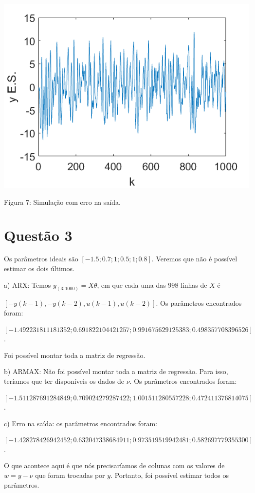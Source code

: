 \documentclass{rbfin}
\begin{document}
\begin{center}
\includegraphics[scale=0.666]{7}

Figura 7: Simulação com erro na saída.
\end{center}


\section*{Questão 3}

Os parâmetros ideais são $[-1.5; 0.7; 1; 0.5; 1; 0.8]$. Veremos que não é possível estimar os dois últimos.

a) ARX: Temos $y_{(3:1000)} = X \theta$, em que cada uma das $998$ linhas de $X$ é 

$[-y(k-1), -y(k-2), u(k - 1), u(k - 2)]$. Os parâmetros encontrados foram: 

$[-1.492231811181352;0.691822104421257;0.991675629125383;0.498357708396526]$.

Foi possível montar toda a matriz de regressão.

b) ARMAX: Não foi possível montar toda a matriz de regressão. Para isso, teríamos que ter disponíveis os dados de $\nu$. Os parâmetros encontrados foram: 

$[-1.511287691284849;0.709024279287422;1.001511280557228;0.472411376814075]$.

c) Erro na saída: os parâmetros encontrados foram: 

$[-1.428278426942452;0.632047338684911;0.973519519942481;0.582697779355300]$.

O que acontece aqui é que nós precisaríamos de colunas com os valores de $w = y - \nu$ que foram trocadas por $y$. Portanto, foi possível estimar todos os parâmetros.
\end{document}
